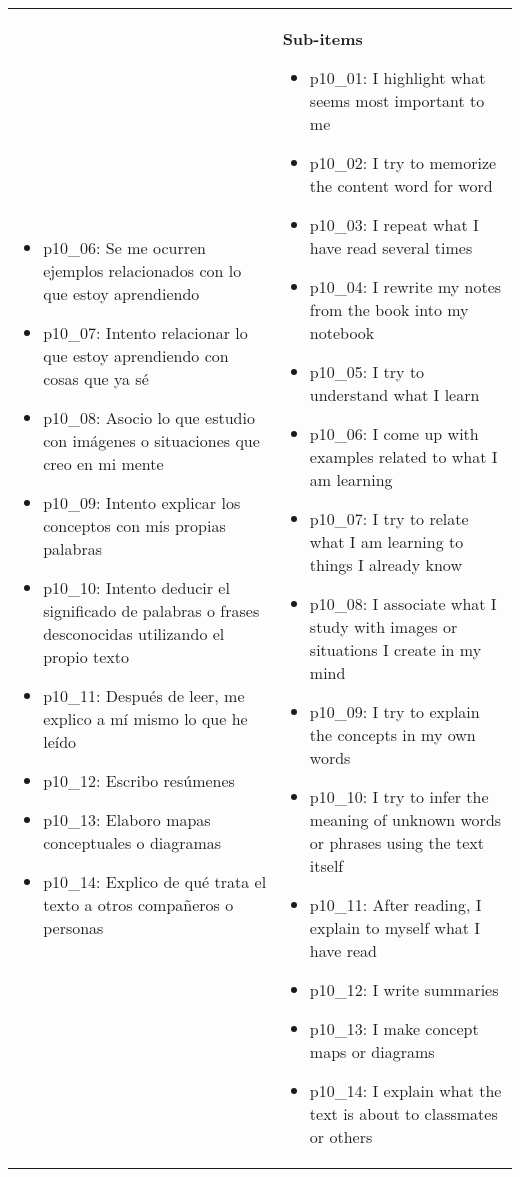 \documentclass[11pt]{article}
\begin{document}
\begin{longtable}{@{}LL@{}}
\begin{itemize}[leftmargin=*]
\item p10\_06: Se me ocurren ejemplos relacionados con lo que estoy aprendiendo
\item p10\_07: Intento relacionar lo que estoy aprendiendo con cosas que ya sé
\item p10\_08: Asocio lo que estudio con imágenes o situaciones que creo en mi mente
\item p10\_09: Intento explicar los conceptos con mis propias palabras
\item p10\_10: Intento deducir el significado de palabras o frases desconocidas utilizando el propio texto
\item p10\_11: Después de leer, me explico a mí mismo lo que he leído
\item p10\_12: Escribo resúmenes
\item p10\_13: Elaboro mapas conceptuales o diagramas
\item p10\_14: Explico de qué trata el texto a otros compañeros o personas\end{itemize} & \textbf{Sub-items}\par\begin{itemize}[leftmargin=*]\item p10\_01: I highlight what seems most important to me
\item p10\_02: I try to memorize the content word for word
\item p10\_03: I repeat what I have read several times
\item p10\_04: I rewrite my notes from the book into my notebook
\item p10\_05: I try to understand what I learn
\item p10\_06: I come up with examples related to what I am learning
\item p10\_07: I try to relate what I am learning to things I already know
\item p10\_08: I associate what I study with images or situations I create in my mind
\item p10\_09: I try to explain the concepts in my own words
\item p10\_10: I try to infer the meaning of unknown words or phrases using the text itself
\item p10\_11: After reading, I explain to myself what I have read
\item p10\_12: I write summaries
\item p10\_13: I make concept maps or diagrams
\item p10\_14: I explain what the text is about to classmates or others\end{itemize} \\

\end{longtable}
\end{document}
